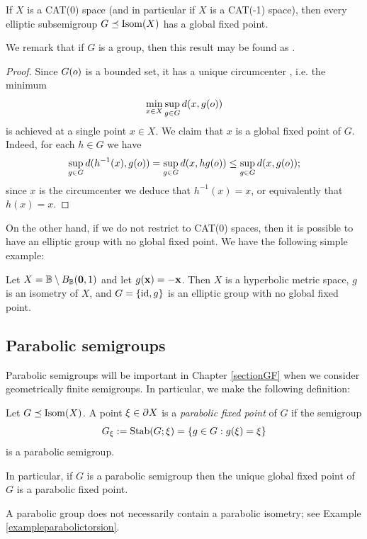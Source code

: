 \begin{theorem} \label{Cartan's lemma}
If $X$ is a CAT(0) space (and in particular if $X$ is a CAT(-1) space), then every elliptic subsemigroup $G\preceq\operatorname{Isom}(X)$ has a global fixed point.
\end{theorem}
We remark that if $G$ is a group, then this result may be found as \cite[Corollary II.2.8(1)]{BridsonHaefliger}.
\begin{proof}
Since $G(o)$ is a bounded set, it has a unique circumcenter \cite[Proposition II.2.7]{BridsonHaefliger}, i.e. the minimum
\[
\min_{x\in X}\sup_{g\in G}d(x,g(o))
\]
is achieved at a single point $x\in X$. We claim that $x$ is a global fixed point of $G$. Indeed, for each $h\in G$ we have
\[
\sup_{g\in G}d(h^{-1}(x),g(o)) = \sup_{g\in G}d(x,h g(o)) \leq \sup_{g\in G}d(x,g(o));
\]
since $x$ is the circumcenter we deduce that $h^{-1}(x) = x$, or equivalently that $h(x) = x$.
\end{proof}

On the other hand, if we do not restrict to CAT(0) spaces, then it is possible to have an elliptic group with no global fixed point. We have the following simple example:
\begin{example}
Let $X = \B\butnot B_\B(\0,1)$ and let $g(\mathbf x) = -\mathbf x$. Then $X$ is a hyperbolic metric space, $g$ is an isometry of $X$, and $G = \{\mathrm{id},g\}$ is an elliptic group with no global fixed point.
\end{example}

\subsection{Parabolic semigroups}
Parabolic semigroups will be important in Chapter \ref{sectionGF} when we consider geometrically finite semigroups. In particular, we make the following definition:
\begin{definition}
\label{definitionparabolic}
Let $G\preceq\operatorname{Isom}(X)$. A point $\xi\in\partial X$ is a \emph{parabolic fixed point} of $G$ if the semigroup
\[
G_\xi := \operatorname{Stab}(G;\xi) = \{g\in G:g(\xi) = \xi\}
\]
is a parabolic semigroup.
\end{definition}
In particular, if $G$ is a parabolic semigroup then the unique global fixed point of $G$ is a parabolic fixed point.
\begin{warning}
A parabolic group does not necessarily contain a parabolic isometry; see Example \ref{exampleparabolictorsion}.
\end{warning}

